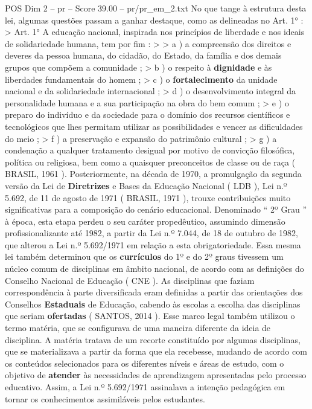\begin{textsample}{POS Dim 2 – pr – Score 39.00 – pr/pr\_em\_2.txt}
No que tange à estrutura desta lei, algumas questões passam a ganhar destaque, como as delineadas no Art. 1{\EmojiFont °} : > Art. 1{\EmojiFont °} A educação nacional, inspirada nos princípios de liberdade e nos ideais de solidariedade humana, tem por fim : > > a ) a compreensão dos direitos e deveres da pessoa humana, do cidadão, do Estado, da família e dos demais grupos que compõem a comunidade ; > b ) o respeito à \textbf{dignidade} e às liberdades fundamentais do homem ; > c ) o \textbf{fortalecimento} da unidade nacional e da solidariedade internacional ; > d ) o desenvolvimento integral da personalidade humana e a sua participação na obra do bem comum ; > e ) o preparo do indivíduo e da sociedade para o domínio dos recursos científicos e tecnológicos que lhes permitam utilizar as possibilidades e vencer as dificuldades do meio ; > f ) a preservação e expansão do patrimônio cultural ; > g ) a condenação a qualquer tratamento desigual por motivo de convicção filosófica, política ou religiosa, bem como a quaisquer preconceitos de classe ou de raça ( BRASIL, 1961 ).
Posteriormente, na década de 1970, a promulgação da segunda versão da Lei de \textbf{Diretrizes} e Bases da Educação Nacional ( LDB ), Lei n.º 5.692, de 11 de agosto de 1971 ( BRASIL, 1971 ), trouxe contribuições muito significativas para a composição do cenário educacional.
Denominado “ 2º Grau ” à época, esta etapa perdeu o seu caráter propedêutico, assumindo dimensão profissionalizante até 1982, a partir da Lei n.º 7.044, de 18 de outubro de 1982, que alterou a Lei n.º 5.692/1971 em relação a esta obrigatoriedade.
Essa mesma lei também determinou que os \textbf{currículos} do 1º e do 2º graus tivessem um núcleo comum de disciplinas em âmbito nacional, de acordo com as definições do Conselho Nacional de Educação ( CNE ).
As disciplinas que faziam correspondência à parte diversificada eram definidas a partir das orientações dos Conselhos \textbf{Estaduais} de Educação, cabendo às escolas a escolha das disciplinas que seriam \textbf{ofertadas} ( SANTOS, 2014 ).
Esse marco legal também utilizou o termo matéria, que se configurava de uma maneira diferente da ideia de disciplina.
A matéria tratava de um recorte constituído por algumas disciplinas, que se materializava a partir da forma que ela recebesse, mudando de acordo com os conteúdos selecionados para os diferentes níveis e áreas de estudo, com o objetivo de \textbf{atender} às necessidades de aprendizagem apresentadas pelo processo educativo.
Assim, a Lei n.º 5.692/1971 assinalava a intenção pedagógica em tornar os conhecimentos assimiláveis pelos estudantes.

\end{textsample}

